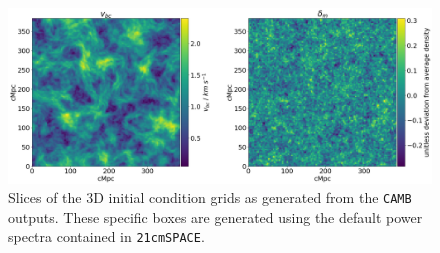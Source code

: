 \documentclass[floats,floatfix,showpacs,amssymb,prd,superscriptaddress,nofootinbib]{revtex4-2} %
\newcommand{\code}{\texttt}
\begin{document}
\begin{figure}[H]
    \centering
    \includegraphics[width=0.9\columnwidth]{images/initial_condition_grid.png}
    \caption{Slices of the 3D initial condition grids as generated from the \code{CAMB} outputs. These specific boxes are generated using the default power spectra contained in \code{21cmSPACE}.}
    \label{fig:initial_condition_grid}
\end{figure}




\nocite{*}
\printbibliography[title={References}]
\end{document}

